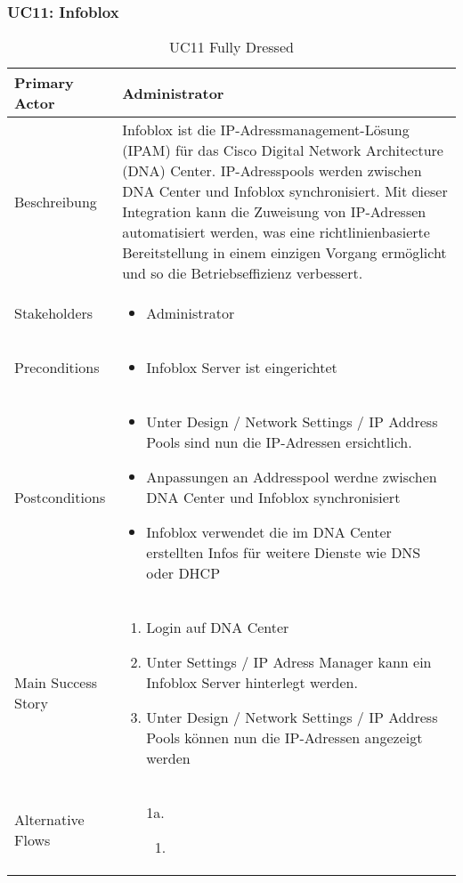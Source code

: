 \subsubsection{UC11: Infoblox}
\begin{table}[H]
	\centering
	\begin{tabularx}{\textwidth}{l | X}
		Primary Actor   & Administrator       \\
		\hline
		Beschreibung   & Infoblox ist die IP-Adressmanagement-Lösung (IPAM) für das Cisco Digital Network Architecture (DNA) Center. IP-Adresspools werden zwischen DNA Center und Infoblox synchronisiert. Mit dieser Integration kann die Zuweisung von IP-Adressen automatisiert werden, was eine richtlinienbasierte Bereitstellung in einem einzigen Vorgang ermöglicht und so die Betriebseffizienz verbessert.  \\ 
		\hline
		Stakeholders       & 
		\begin{itemize}
			\item Administrator
		\end{itemize} \\ 
		Preconditions      &
		\begin{itemize}	
			\item Infoblox Server ist eingerichtet
		\end{itemize}  \\
		\hline
		Postconditions     & 
		\begin{itemize}	
			\item Unter Design / Network Settings / IP Address Pools sind nun die IP-Adressen ersichtlich.
			\item Anpassungen an Addresspool werdne zwischen DNA Center und Infoblox synchronisiert
			\item Infoblox verwendet die im DNA Center erstellten Infos für weitere Dienste wie DNS oder DHCP
		\end{itemize}  \\
		\hline
		Main Success Story & 
		\begin{enumerate}
			\item Login auf DNA Center
			\item Unter Settings / IP Adress Manager kann ein Infoblox Server hinterlegt werden.
			\item Unter Design / Network Settings / IP Address Pools können nun die IP-Adressen angezeigt werden
		\end{enumerate}
		\\
		\hline
		Alternative Flows  & 
		\begin{itemize}
			\item[1a.]  
			\begin{enumerate}
				\item 
			\end{enumerate}
		\end{itemize}
	\end{tabularx}
	\caption{UC11 Fully Dressed}
	\label{tab:UC11}
\end{table}

